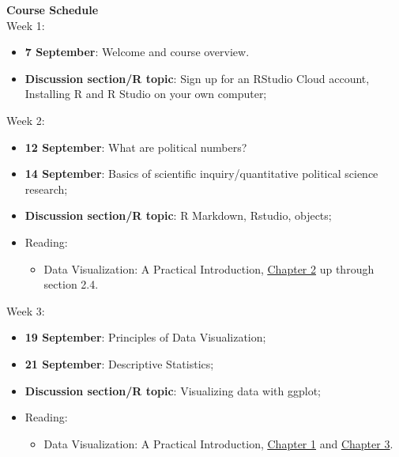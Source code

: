 \documentclass[12pt]{article}
\begin{document}
\noindent \Large \textbf{Course Schedule}\normalsize\\

\noindent Week 1:
\begin{itemize}
\item \textbf{7 September}: Welcome and course overview.
\item \textbf{Discussion section/R topic}: Sign up for an RStudio Cloud account, Installing R and R Studio on your own computer;
\end{itemize}

\noindent Week 2:
\begin{itemize}
\item \textbf{12 September}: What are political numbers?
\item \textbf{14 September}: Basics of scientific inquiry/quantitative political science research;
\item \textbf{Discussion section/R topic}: R Markdown, Rstudio, objects;
\item Reading: 
\begin{itemize}
\item Data Visualization: A Practical Introduction, \href{https://socviz.co/gettingstarted.html#be-patient-with-r-and-with-yourself}{\color{blue}\underline{Chapter 2}} up through section 2.4.
\end{itemize}
\end{itemize}

\noindent Week 3:
\begin{itemize}
\item \textbf{19 September}: Principles of Data Visualization;
\item \textbf{21 September}: Descriptive Statistics;
\item \textbf{Discussion section/R topic}: Visualizing data with ggplot;
\item Reading: 
\begin{itemize}
\item Data Visualization: A Practical Introduction, \href{https://socviz.co/lookatdata.html#lookatdata}{\color{blue}\underline{Chapter 1}} and \href{https://socviz.co/makeplot.html#makeplot}{\color{blue}\underline{Chapter 3}}.
\end{itemize}
\end{itemize}
\end{document}
